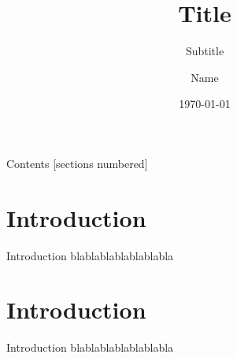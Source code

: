 \documentclass[10pt]{beamer}
\title{Title}
\subtitle{Subtitle}
\date{\today}
\author{Name}
\institute{Institute}
\begin{document}
\maketitle

\begin{frame}{Contents}
    [sections numbered]
    \tableofcontents[hideallsubsections]
\end{frame}

\section{Introduction}
\begin{frame}{Introduction}
        blablablablablablabla
\end{frame}

\section{Introduction}
\begin{frame}{Introduction}
        blablablablablablabla
\end{frame}
\end{document}
